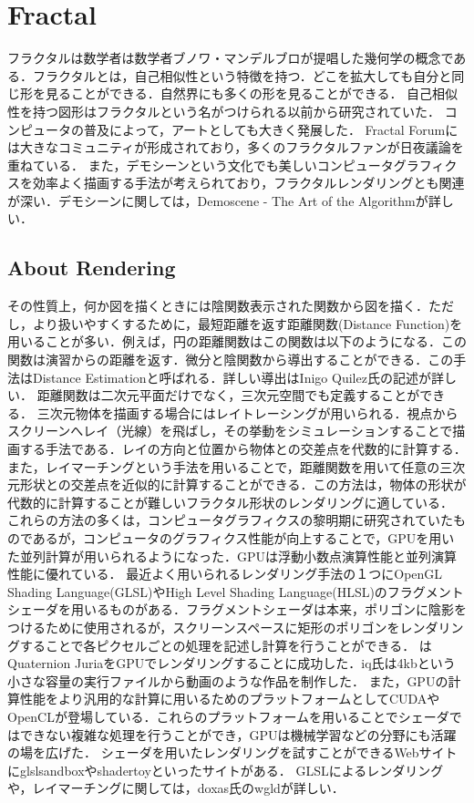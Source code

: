 \section{Fractal}
フラクタルは数学者は数学者ブノワ・マンデルブロが提唱した幾何学の概念である．フラクタルとは，自己相似性という特徴を持つ．どこを拡大しても自分と同じ形を見ることができる．自然界にも多くの形を見ることができる．
自己相似性を持つ図形はフラクタルという名がつけられる以前から研究されていた．
コンピュータの普及によって，アートとしても大きく発展した．
Fractal Forumには大きなコミュニティが形成されており，多くのフラクタルファンが日夜議論を重ねている．
また，デモシーンという文化でも美しいコンピュータグラフィクスを効率よく描画する手法が考えられており，フラクタルレンダリングとも関連が深い．デモシーンに関しては，Demoscene - The Art of the Algorithmが詳しい．

\subsection{About Rendering}

その性質上，何か図を描くときには陰関数表示された関数から図を描く．ただし，より扱いやすくするために，最短距離を返す距離関数(Distance Function)を用いることが多い．例えば，円の距離関数はこの関数は以下のようになる．この関数は演習からの距離を返す．微分と陰関数から導出することができる．この手法はDistance Estimationと呼ばれる．詳しい導出はInigo Quilez氏の記述が詳しい．
距離関数は二次元平面だけでなく，三次元空間でも定義することができる．
三次元物体を描画する場合にはレイトレーシングが用いられる．視点からスクリーンへレイ（光線）を飛ばし，その挙動をシミュレーションすることで描画する手法である．レイの方向と位置から物体との交差点を代数的に計算する．
また，レイマーチングという手法を用いることで，距離関数を用いて任意の三次元形状との交差点を近似的に計算することができる．この方法は，物体の形状が代数的に計算することが難しいフラクタル形状のレンダリングに適している．
これらの方法の多くは，コンピュータグラフィクスの黎明期に研究されていたものであるが，コンピュータのグラフィクス性能が向上することで，GPUを用いた並列計算が用いられるようになった．GPUは浮動小数点演算性能と並列演算性能に優れている．
最近よく用いられるレンダリング手法の１つにOpenGL Shading Language(GLSL)やHigh Level Shading Language(HLSL)のフラグメントシェーダを用いるものがある．フラグメントシェーダは本来，ポリゴンに陰影をつけるために使用されるが，スクリーンスペースに矩形のポリゴンをレンダリングすることで各ピクセルごとの処理を記述し計算を行うことができる．
はQuaternion JuriaをGPUでレンダリングすることに成功した．iq氏は4kbという小さな容量の実行ファイルから動画のような作品を制作した．
また，GPUの計算性能をより汎用的な計算に用いるためのプラットフォームとしてCUDAやOpenCLが登場している．これらのプラットフォームを用いることでシェーダではできない複雑な処理を行うことができ，GPUは機械学習などの分野にも活躍の場を広げた．
シェーダを用いたレンダリングを試すことができるWebサイトにglslsandboxやshadertoyといったサイトがある．
GLSLによるレンダリングや，レイマーチングに関しては，doxas氏のwgldが詳しい．

